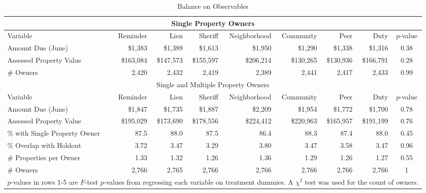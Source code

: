\documentclass[12pt]{article}
\begin{document}
\begin{appendix}
\begin{sidewaystable}[htbp]
\centering
\caption{Balance on Observables}
\label{balance2}
\begin{tabular}{lrrrrrrrc}
\hline
\multicolumn{9}{c}{Single Property Owners} \\
  \hline
Variable & Reminder & Lien & Sheriff & Neighborhood & Community & Peer & Duty & $p$-value \\
   \hline
Amount Due (June) & \$1,383 & \$1,389 & \$1,613 & \$1,950 & \$1,290 & \$1,338 & \$1,316 & 0.38 \\
  Assessed Property Value & \$163,084 & \$147,573 & \$155,597 & \$206,214 & \$130,265 & \$130,936 & \$166,791 & 0.28 \\
  \# Owners & 2,420 & 2,432 & 2,419 & 2,389 & 2,441 & 2,417 & 2,433 & 0.99 \\
  \hline
\multicolumn{9}{c}{Single and Multiple Property Owners} \\
  \hline
Variable & Reminder & Lien & Sheriff & Neighborhood & Community & Peer & Duty & $p$-value \\
   \hline
Amount Due (June) & \$1,847 & \$1,735 & \$1,887 & \$2,209 & \$1,954 & \$1,772 & \$1,700 & 0.78 \\
  Assessed Property Value & \$195,029 & \$173,690 & \$178,556 & \$224,412 & \$220,963 & \$165,957 & \$191,199 & 0.76 \\
  \% with Single Property Owner & 87.5 & 88.0 & 87.5 & 86.4 & 88.3 & 87.4 & 88.0 & 0.45 \\
  \% Overlap with Holdout & 3.72 & 3.47 & 3.29 & 3.80 & 3.47 & 3.58 & 3.47 & 0.96 \\
  \# Properties per Owner & 1.33 & 1.32 & 1.26 & 1.36 & 1.29 & 1.26 & 1.27 & 0.55 \\
  \# Owners & 2,766 & 2,765 & 2,766 & 2,766 & 2,766 & 2,766 & 2,766 & 1 \\
  \hline
\multicolumn{9}{l}{\scriptsize{$p$-values in rows 1-5 are $F$-test $p$-values from regressing each variable on treatment dummies. A $\chi^2$ test was used for the count of owners.}} \\
\end{tabular}
\end{sidewaystable}



\end{appendix}
\end{document}
